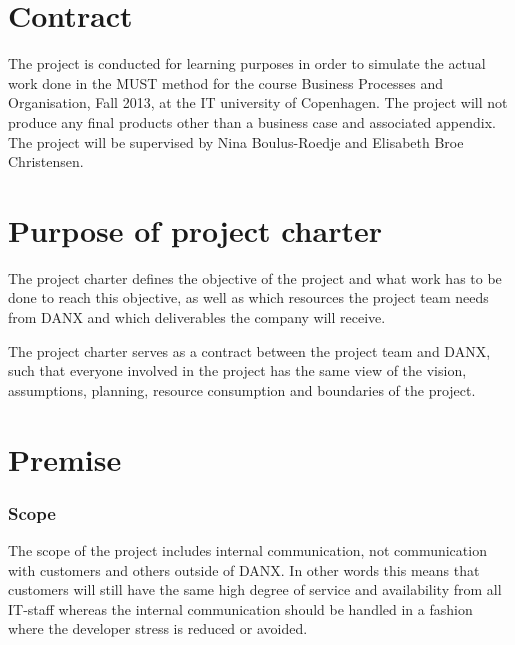 \documentclass[pdftext, 12pt, a4paper]{report}
\begin{document}

\section*{Contract}
The project is conducted for learning purposes in order to simulate the actual work done in the MUST method for the course Business Processes and Organisation, Fall 2013, at the IT university of Copenhagen. The project will not produce any final products other than a business case and associated appendix. The project will be supervised by Nina Boulus-Roedje and Elisabeth Broe Christensen.

\section*{Purpose of project charter}
The project charter defines the objective of the project and what work has to be done to reach this objective, as well as which resources the project team needs from DANX and which deliverables the company will receive.

The project charter serves as a contract between the project team and DANX, such that everyone involved in the project has the same view of the vision, assumptions, planning, resource consumption and boundaries of the project.


\section*{Premise}
\subsubsection*{Scope}
The scope of the project includes internal communication, not communication with customers and others outside of DANX. In other words this means that customers will still have the same high degree of service and availability from all IT-staff whereas the internal communication should be handled in a fashion where the developer stress is reduced or avoided. 
\end{document}
